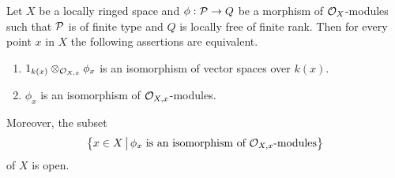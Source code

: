 \begin{lemma}\label{lemma:isomorphism_locus_of_module_morphism}
Let $X$ be a locally ringed space and $\phi:{\mathcal P} \rightarrow Q$ be a morphism of ${\mathcal O}_X$-modules such that ${\mathcal P}$ is of finite type and $Q$ is locally free of finite rank. Then for every point $x$ in $X$ the following assertions are equivalent.
\begin{enumerate}[label=\emph{\textbf{(\roman*)}}, leftmargin=3.0em]
\item $1_{k(x)}\otimes_{{\mathcal O}_{X,x}}\phi_{x}$ is an isomorphism of vector spaces over $k(x)$.
\item $\phi_{x}$ is an isomorphism of ${\mathcal O}_{X,x}$-modules.
\end{enumerate}
Moreover, the subset
$$\big\{x\in X\,\big|\,\phi_{x}\mbox{ is an isomorphism of }{\mathcal O}_{X,x}\mbox{-modules}\big\}$$
of $X$ is open.
\end{lemma}
